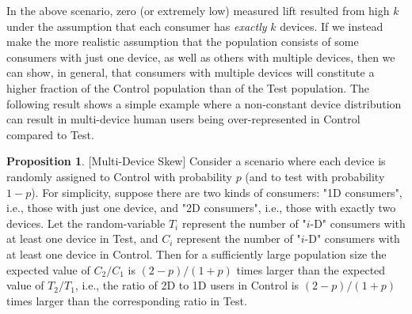 \documentclass[11pt,a4paper]{article}
\theoremstyle{definition}
\theoremstyle{remark}
\theoremstyle{definition}
\theoremstyle{definition}
\theoremstyle{definition}
\theoremstyle{definition}
\theoremstyle{definition}
\theoremstyle{definition}
\newtheorem{proposition}[theorem]{Proposition}
\begin{document}
In the above scenario, zero (or extremely low) measured lift resulted from high $k$ under the assumption that each consumer has {\em exactly} $k$ devices. If we instead make the more realistic assumption that the population consists of some consumers with just one device, as well as others with multiple devices, then we can show, in general, that consumers with multiple devices will constitute a higher fraction of the Control population than of the Test population. The following result shows a simple example where a non-constant device distribution can result in multi-device human users being over-represented in Control compared to Test.
\begin{proposition}\small [Multi-Device Skew] \label{prop-md-skew}
Consider a scenario where each device is randomly assigned to Control with probability $p$ (and to test with probability $1-p$). For simplicity, suppose there are two kinds of consumers: "1D consumers", i.e., those with just one device, and "2D consumers", i.e., those with exactly two devices. Let the random-variable $T_i$ represent the number of "$i$-D" consumers with at least one device in Test, and $C_i$ represent the number of "$i$-D" consumers with at least one device in Control. Then for a sufficiently large population size the expected value of $C_2/C_1$ is $(2-p)/(1+p)$ times larger than the expected value of $T_2/T_1$, i.e., the ratio of 2D to 1D users in Control is $(2-p)/(1+p)$ times larger than the corresponding ratio in Test.
\end{proposition}
\end{document}
